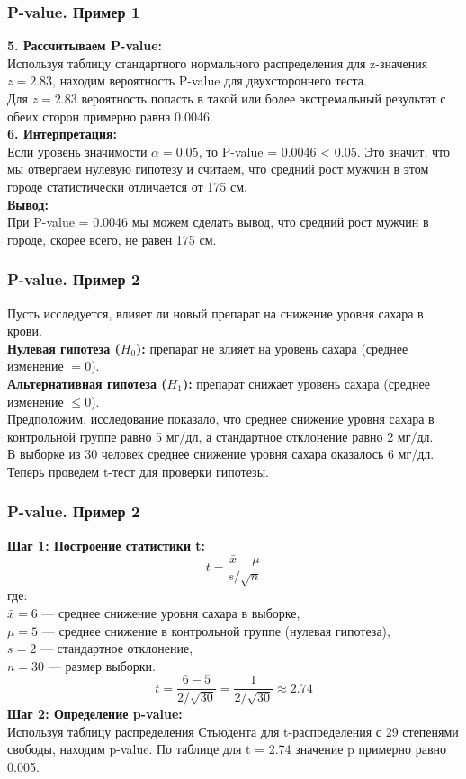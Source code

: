 \documentclass[aspectratio=169]{beamer}
\begin{document}
\begin{frame}
\frametitle{P-value. Пример 1}
{\bf 5. Рассчитываем P-value:}\\
Используя таблицу стандартного нормального распределения для z-значения \( z = 2.83 \), находим вероятность P-value для двухстороннего теста.\\
Для \( z = 2.83 \) вероятность попасть в такой или более экстремальный результат с обеих сторон примерно равна 0.0046.\\
{\bf 6. Интерпретация:}\\
Если уровень значимости \( \alpha = 0.05 \), то P-value = 0.0046 < 0.05. Это значит, что мы отвергаем нулевую гипотезу и считаем, что средний рост мужчин в этом городе статистически отличается от 175 см.\\
{\bf Вывод:}\\
При P-value = 0.0046 мы можем сделать вывод, что средний рост мужчин в городе, скорее всего, не равен 175 см.
\end{frame}

\begin{frame}
\frametitle{P-value. Пример 2}
Пусть исследуется, влияет ли новый препарат на снижение уровня сахара в крови.\\
{\bf Нулевая гипотеза (\(H_0\)):} препарат не влияет на уровень сахара (среднее изменение \(= 0\)).\\ 
{\bf Альтернативная гипотеза (\(H_1\)):} препарат снижает уровень сахара (среднее изменение \(\leq 0\)).\\
Предположим, исследование показало, что среднее снижение уровня сахара в контрольной группе равно 5 мг/дл, а стандартное отклонение равно 2 мг/дл.\\
В выборке из 30 человек среднее снижение уровня сахара оказалось 6 мг/дл.\\
Теперь проведем t-тест для проверки гипотезы.
\end{frame}

\begin{frame}
\frametitle{P-value. Пример 2}
{\bf Шаг 1: Построение статистики t:}\\
\[
t = \frac{\bar{x} - \mu}{s/\sqrt{n}}
\]
где:\\
\quad \(\bar{x} = 6\) — среднее снижение уровня сахара в выборке,\\
\quad \(\mu = 5\) — среднее снижение в контрольной группе (нулевая гипотеза),\\
\quad \(s = 2\) — стандартное отклонение,\\
\quad \(n = 30\) — размер выборки.
\[
t = \frac{6 - 5}{2/\sqrt{30}} = \frac{1}{2/\sqrt{30}} \approx 2.74
\]
{\bf Шаг 2: Определение p-value:}\\
Используя таблицу распределения Стьюдента для t-распределения с 29 степенями свободы, находим p-value. По таблице для t = 2.74 значение p примерно равно 0.005.\\
\end{frame}
\end{document}
